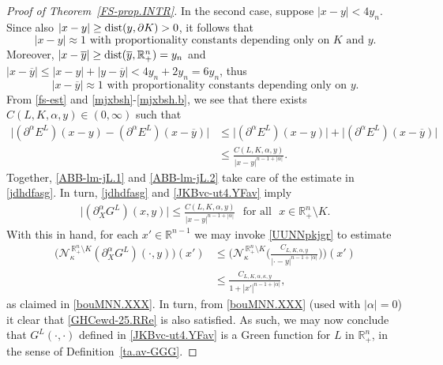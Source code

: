 \documentclass[11pt,reqno]{amsart}
\numberwithin{equation}{section}
\theoremstyle{remark}
\begin{document}
\begin{proof}[Proof of Theorem~\ref{FS-prop.INTR}]
In the second case, suppose $|x-y|<4y_n$. Since also $|x-y|\geq{\rm dist}(y,\partial K)>0$, it follows that 
%
\begin{equation}\label{mjxbsh}
\text{$|x-y|\approx 1$ with proportionality constants depending only on $K$ and $y$.}
\end{equation}
%
Moreover, $|x-\overline{y}|\geq{\rm dist}(\overline{y},{\mathbb{R}}^n_{+})=y_n$ and
$|x-\overline{y}|\leq |x-y|+|y-\overline{y}|<4y_n+2y_n=6y_n$, thus 
%
\begin{equation}\label{mjxbsh.b}
\text{$|x-\overline{y}|\approx 1$ with proportionality constants depending only on $y$.}
\end{equation}
%
From \eqref{fs-est} and \eqref{mjxbsh}-\eqref{mjxbsh.b}, we see that there exists 
$C(L,K,\alpha,y)\in(0,\infty)$ such that 
%
\begin{align}\label{ABB-lm-jL.2}
\big|(\partial^\alpha E^L)(x-y)-(\partial^\alpha E^L)(x-\overline{y})\big|
&\leq\big|(\partial^\alpha E^L)(x-y)\big|+\big|(\partial^\alpha E^L)(x-\overline{y})\big|
\nonumber\\[4pt]
&\leq\frac{C(L,K,\alpha,y)}{|x-y|^{n-1+|\alpha|}}.
\end{align}
%
Together, \eqref{ABB-lm-jL.1} and \eqref{ABB-lm-jL.2} take care of the estimate in \eqref{jdhdfasg}. 
In turn, \eqref{jdhdfasg} and \eqref{JKBvc-ut4.YFav} imply
%
\begin{align}\label{ABB-lm-jL.3}
\big|(\partial^\alpha_X G^L)(x,y)\big|\leq\frac{C(L,K,\alpha,y)}{|x-y|^{n-1+|\alpha|}}
\,\,\text{ for all }\,\,x\in{\mathbb{R}}^n_{+}\setminus K.
\end{align}
%
With this in hand, for each $x'\in{\mathbb{R}}^{n-1}$ we may invoke \eqref{UUNNpkjgr} to estimate
%
\begin{align}\label{ABB-lm-jL.4}
\Big(\mathcal{N}^{\,{\mathbb{R}}^n_{+}\setminus K}_\kappa(\partial^\alpha_X G^L)(\cdot,y)\Big)(x')
&\leq \Big(\mathcal{N}^{\,{\mathbb{R}}^n_{+}\setminus K}_\kappa\Big(\frac{C_{L,K,\alpha,y}}{|\cdot-y|^{n-1+|\alpha|}}\Big)\Big)(x')
\nonumber\\[4pt]
&\leq\frac{C_{L,K,\alpha,\kappa,y}}{1+|x'|^{n-1+|\alpha|}},
\end{align}
%
as claimed in \eqref{bouMNN.XXX}. In turn, from \eqref{bouMNN.XXX} (used with $|\alpha|=0$) it clear that 
\eqref{GHCewd-25.RRe} is also satisfied. As such, we may now conclude that $G^L(\cdot,\cdot)$ defined in \eqref{JKBvc-ut4.YFav}
is a Green function for $L$ in $\mathbb{R}^n_{+}$, in the sense of Definition~\ref{ta.av-GGG}.


\end{proof}
\end{document}
